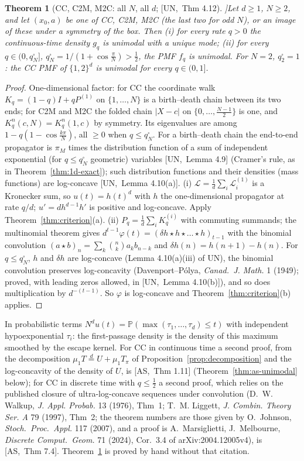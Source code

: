 \documentclass[10pt,a4paper]{article}
\theoremstyle{plain}
\newtheorem{theorem}{Theorem}[section]
\theoremstyle{definition}
\newcommand{\src}[2]{[\textsf{#1},~#2]}           %
\newcommand{\ASY}{\textsf{AS}}
\newcommand{\UNI}{\textsf{UN}}
\renewcommand{\P}{\mathbb{P}}
\newcommand{\Lg}{\mathcal{L}}
\newcommand{\qbox}{q^{\square}_N}
\begin{document}
\begin{theorem}[CC, C2M, M2C: all $N$, all $d$; \src{\UNI}{Thm 4.12}]\label{thm:three-geometries}
Let $d\ge1$, $N\ge2$, and let $(x_0,a)$ be one of CC, C2M, M2C (the last two for odd $N$), or an image of these under a symmetry of the box. Then
(i) for every rate $q>0$ the continuous-time density $g_q$ is unimodal with a unique mode;
(ii) for every $q\in(0,\qbox]$, $\qbox=1/(1+\cos\frac\pi N)>\frac12$, the PMF $f_q$ is unimodal. For $N=2$, $q_2^\square=1$: the CC PMF of $\{1,2\}^d$ is unimodal for every $q\in(0,1]$.
\end{theorem}
\begin{proof}
One-dimensional factor: for CC the coordinate walk $K_q=(1-q)I+qP^{(1)}$ on $\{1,\dots,N\}$ is a birth--death chain between its two ends; for C2M and M2C the folded chain $|X-c|$ on $\{0,\dots,\frac{N-1}2\}$ is one, and $K_q^n(c,N)=K_q^n(1,c)$ by symmetry. Its eigenvalues are among $1-q(1-\cos\frac{k\pi}N)$, all $\ge0$ when $q\le\qbox$. For a birth--death chain the end-to-end propagator is $\pi_M$ times the distribution function of a sum of independent exponential (for $q\le\qbox$ geometric) variables \src{\UNI}{Lemma 4.9} (Cramer's rule, as in Theorem~\ref{thm:1d-exact}); such distribution functions and their densities (mass functions) are log-concave \src{\UNI}{Lemma 4.10(a)}.
(i) $\Lg=\frac1d\sum_i\Lg^{(1)}_i$ is a Kronecker sum, so $u(t)=h(t)^d$ with $h$ the one-dimensional propagator at rate $q/d$; $u'=dh^{d-1}h'$ is positive and log-concave. Apply Theorem~\ref{thm:criterion}(a).
(ii) $P_q=\frac1d\sum_iK^{(i)}_q$ with commuting summands; the multinomial theorem gives $d^{t-1}\varphi(t)=(\delta h\star h\star\dots\star h)_{t-1}$ with the binomial convolution $(a\star b)_n=\sum_k\binom nka_kb_{n-k}$ and $\delta h(n)=h(n+1)-h(n)$. For $q\le\qbox$, $h$ and $\delta h$ are log-concave (Lemma 4.10(a)(iii) of \UNI), the binomial convolution preserves log-concavity (Davenport--P\'olya, \emph{Canad.\ J. Math.} 1 (1949); proved, with leading zeros allowed, in \src{\UNI}{Lemma 4.10(b)}), and so does multiplication by $d^{-(t-1)}$. So $\varphi$ is log-concave and Theorem~\ref{thm:criterion}(b) applies.
\end{proof}
In probabilistic terms $N^du(t)=\P(\max(\tau_1,\dots,\tau_d)\le t)$ with independent hypoexponential $\tau_i$: the first-passage density is the density of this maximum smoothed by the escape kernel. For CC in continuous time a second proof, from the decomposition $\mu_1T\overset d=U+\mu_1T_\pi$ of Proposition~\ref{prop:decomposition} and the log-concavity of the density of $U$, is \src{\ASY}{Thm 1.11} (Theorem~\ref{thm:as-unimodal} below); for CC in discrete time with $q\le\frac12$ a second proof, which relies on the published closure of ultra-log-concave sequences under convolution (D.~W. Walkup, \emph{J. Appl. Probab.} 13 (1976), Thm~1; T.~M. Liggett, \emph{J. Combin. Theory Ser. A} 79 (1997), Thm~2; the theorem numbers are those given by O.~Johnson, \emph{Stoch.\ Proc.\ Appl.} 117 (2007), and a proof is A.~Marsiglietti, J.~Melbourne, \emph{Discrete Comput.\ Geom.} 71 (2024), Cor.~3.4 of arXiv:2004.12005v4), is \src{\ASY}{Thm 7.4}. Theorem~\ref{thm:three-geometries} is proved by hand without that citation.
\end{document}

